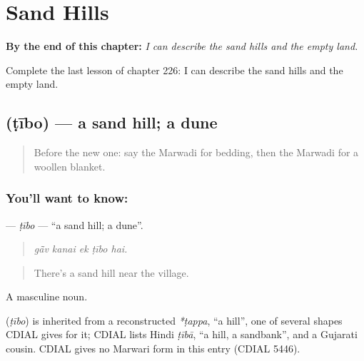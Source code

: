 
\chapter{Sand Hills}
\label{ch:mw-sand-hills}

\begin{chapteropening}
\textbf{By the end of this chapter:} \emph{I can describe the sand hills and the empty land.}

Complete the last lesson of chapter 226: I can describe the sand hills and the empty land.
\end{chapteropening}

\section[\texorpdfstring{\mw{टीबो} (ṭībo)}{टीबो (ṭībo)}]{ (ṭībo) — a sand hill; a dune}

\label{lesson:MW-C226-tibo}



\begin{quote}
Before the new one: say the Marwadi for bedding, then the Marwadi for a woollen blanket.
\end{quote}

\subsection*{You'll want to know: }
\textbf{} — \emph{ṭībo} — \textquotedblleft{}a sand hill; a dune\textquotedblright{}.

\begin{quote}
    
\end{quote}

\begin{quote}
\emph{gā̃v kanai ek ṭībo hai.}
\end{quote}

\begin{quote}
There's a sand hill near the village.
\end{quote}

A masculine noun.

\begin{cousinweb}
\textbf{} (\emph{ṭībo}) is inherited from a reconstructed \emph{*ṭappa}, \textquotedblleft{}a hill\textquotedblright{}, one of several shapes CDIAL gives for it; CDIAL lists Hindi \emph{ṭībā}, \textquotedblleft{}a hill, a sandbank\textquotedblright{}, and a Gujarati cousin. CDIAL gives no Marwari form in this entry (CDIAL 5446).
\end{cousinweb}

